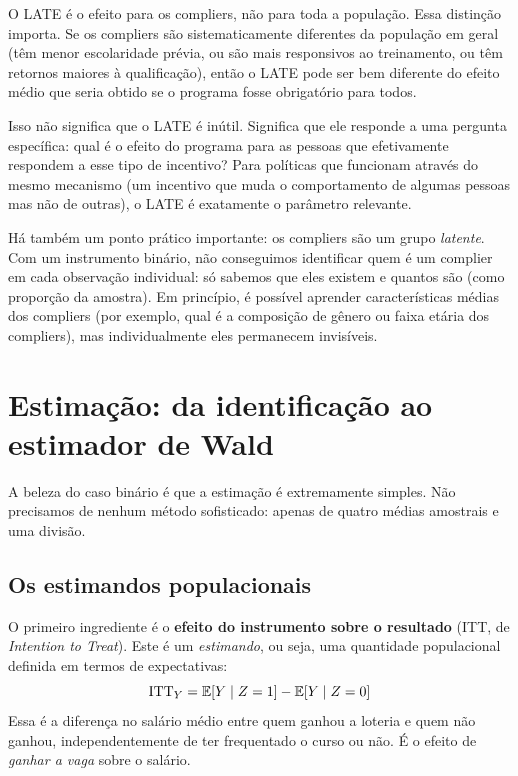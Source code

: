 \begin{atencaobox}
O LATE é o efeito para os compliers, não para toda a população. Essa distinção importa. Se os compliers são sistematicamente diferentes da população em geral (têm menor escolaridade prévia, ou são mais responsivos ao treinamento, ou têm retornos maiores à qualificação), então o LATE pode ser bem diferente do efeito médio que seria obtido se o programa fosse obrigatório para todos.

Isso não significa que o LATE é inútil. Significa que ele responde a uma pergunta específica: qual é o efeito do programa para as pessoas que efetivamente respondem a esse tipo de incentivo? Para políticas que funcionam através do mesmo mecanismo (um incentivo que muda o comportamento de algumas pessoas mas não de outras), o LATE é exatamente o parâmetro relevante.
\end{atencaobox}

Há também um ponto prático importante: os compliers são um grupo \textit{latente}. Com um instrumento binário, não conseguimos identificar quem é um complier em cada observação individual: só sabemos que eles existem e quantos são (como proporção da amostra). Em princípio, é possível aprender características médias dos compliers (por exemplo, qual é a composição de gênero ou faixa etária dos compliers), mas individualmente eles permanecem invisíveis.

\section{Estimação: da identificação ao estimador de Wald}
\label{sec:wald}

A beleza do caso binário é que a estimação é extremamente simples. Não precisamos de nenhum método sofisticado: apenas de quatro médias amostrais e uma divisão.

\subsection*{Os estimandos populacionais}

O primeiro ingrediente é o \textbf{efeito do instrumento sobre o resultado} (ITT, de \textit{Intention to Treat}). Este é um \textit{estimando}, ou seja, uma quantidade populacional definida em termos de expectativas:
\begin{equation}
\text{ITT}_Y = \mathbb{E}[Y \mid Z=1] - \mathbb{E}[Y \mid Z=0]
\end{equation}
Essa é a diferença no salário médio entre quem ganhou a loteria e quem não ganhou, independentemente de ter frequentado o curso ou não. É o efeito de \textit{ganhar a vaga} sobre o salário.

